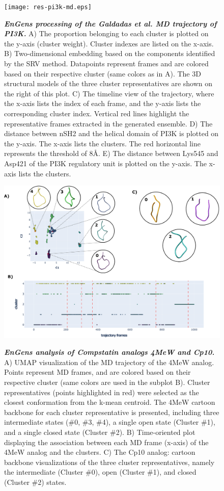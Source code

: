 \documentclass[unnumsec,webpdf,contemporary,large,numsquare]{oup-authoring-template}%
\theoremstyle{thmstyleone}%
\theoremstyle{thmstyletwo}%
\theoremstyle{thmstylethree}%
\begin{document}
\begin{figure}[!t]%
\centering
{\texttt{[image: res-pi3k-md.eps]}}
\caption{\textbf{\textit{EnGens processing of the Galdadas et al. MD trajectory of PI3K.}} A) The proportion belonging to each cluster is plotted on the y-axis (cluster weight). Cluster indexes are listed on the x-axis. B) Two-dimensional embedding based on the components identified by the SRV method. Datapoints represent frames and are colored based on their respective cluster (same colors as in A). The 3D structural models of the three cluster representatives are shown on the right of this plot. C) The timeline view of the trajectory, where the x-axis lists  the index of each frame, and the y-axis lists the corresponding cluster index. Vertical red lines highlight the representative frames extracted in the generated ensemble. D) The distance between nSH2 and the helical domain of PI3K is plotted on the y-axis. The x-axis lists the clusters. The red horizontal line represents the threshold of 8Å.  E) The distance between Lys545 and Asp421 of the PI3K regulatory unit is plotted on the y-axis. The x-axis lists the clusters.}\label{fig-res1b}
\end{figure}

\begin{figure}[!t]%
\centering
{\includegraphics[scale=0.2]{compstatin.eps}}
\caption{\textbf{\textit{ EnGens analysis of Compstatin analogs 4MeW and Cp10.}} A) UMAP visualization of the MD trajectory of the 4MeW analog. Points represent MD frames, and are colored based on their respective cluster (same colors are used in the subplot B). Cluster representatives (points highlighted in red) were selected as the closest conformation from the k-mean centroid. The 4MeW cartoon backbone for each cluster representative is presented, including three intermediate states (\#0, \#3, \#4), a single open state (Cluster \#1), and a single closed state (Cluster \#2). B) Time-oriented plot displaying the association between each MD frame (x-axis) of the 4MeW analog and the clusters. C) The Cp10 analog: cartoon backbone visualizations of the three cluster representatives, namely the intermediate (Cluster \#0), open (Cluster \#1), and closed (Cluster \#2) states. }
\label{fig-res2}
\end{figure}
\end{document}
